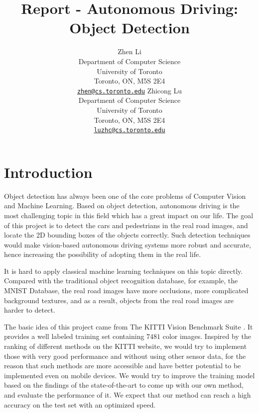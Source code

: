 \documentclass{article} %
\title{Report - Autonomous Driving: Object Detection}
\author{
Zhen Li \\
Department of Computer Science\\
University of Toronto\\
Toronto, ON, M5S 2E4 \\
\href{mailto:zhen@cs.toronto.edu}{\texttt{zhen@cs.toronto.edu}}
\And
Zhicong Lu \\
Department of Computer Science\\
University of Toronto\\
Toronto, ON, M5S 2E4 \\
\href{mailto:luzhc@cs.toronto.edu}{\texttt{luzhc@cs.toronto.edu}}
}
\begin{document}
\maketitle

\section{Introduction}

Object detection has always been one of the core problems of Computer Vision and Machine Learning. Based on object detection, autonomous driving is the most challenging topic in this field which has a great impact on our life. The goal of this project is to detect the cars and pedestrians in the real road images, and locate the 2D bounding boxes of the objects correctly. Such detection techniques would make vision-based autonomous driving systems more robust and accurate, hence increasing the possibility of adopting them in the real life. 

It is hard to apply classical machine learning techniques on this topic directly. Compared with the traditional object recognition database, for example, the MNIST \cite{lecun1998gradient} Database, the real road images have more occlusions, more complicated background textures, and as a result, objects from the real road images are harder to detect. 

The basic idea of this project came from The KITTI Vision Benchmark Suite \cite{Geiger2012CVPR}. It provides a well labeled training set containing $7481$ color images. Inspired by the ranking of different methods on the KITTI website, we would try to implement those with very good performance and without using other sensor data, for the reason that such methods are more accessible and have better potential to be implemented even on mobile devices. We would try to improve the training model based on the findings of the state-of-the-art to come up with our own method, and evaluate the performance of it. We expect that our method can reach a high accuracy on the test set with an optimized speed. 
\end{document}
